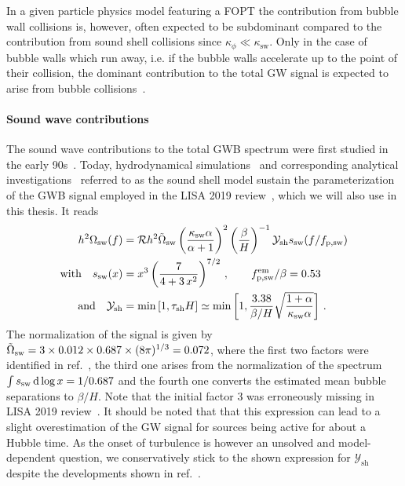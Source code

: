 In a given particle physics model featuring a \ac{FOPT} the contribution from bubble wall collisions is, however,  often expected to be subdominant compared to the contribution from sound shell collisions since $\kappa_\phi \ll \kappa_\text{sw}$. Only in the case of bubble walls which run away, i.e. if the bubble walls accelerate up to the point of their collision, the dominant contribution to the total \ac{GW} signal is expected to arise from bubble collisions~\cite{Vanvlasselaer:2022fqf}. 

\paragraph{Sound wave contributions}

The sound wave contributions to the total \ac{GWB} spectrum were first studied in the early 90s~\cite{Kamionkowski:1993fg}. Today, hydrodynamical simulations~\cite{Hindmarsh:2013xza, Hindmarsh:2015qta, Giblin:2014qia, Cutting:2019zws, Hindmarsh:2017gnf} and corresponding analytical investigations~\cite{Hindmarsh:2016lnk, Hindmarsh:2019phv} referred to as the sound shell model sustain the parameterization of the \ac{GWB} signal  employed in the LISA 2019 review~\cite{Caprini:2019egz, Hindmarsh:2017gnf}, which we will also use in this thesis. It reads
\begin{align}
	h^2 \Omega_\text{sw}(f) &= \mathcal{R}h^2 \tilde{\Omega}_{\text{sw}}  \left( \frac{\kappa_{\text{sw}}  \alpha}{\alpha + 1} \right)^2   \left( \frac{\beta}{H} \right)^{-1}  \mathcal{Y}_\text{sh}  s_{\text{sw}}(f/f_\text{p,\ensuremath{\text{sw}}}) \nonumber \\
	\text{with} \quad s_{\text{sw}}(x) &= x^3 \left( \frac{7}{4 + 3 \, x^2} \right)^{7/2} \, , \qquad f^\text{em}_\text{p,sw} / \beta = 0.53 \nonumber  \\
	\text{and} \quad \mathcal{Y}_\text{sh} &= \min \left[ 1, \tau_\text{sh} H \right] \simeq \min \left[ 1, \frac{3.38}{\beta/H} \sqrt{\frac{1 + \alpha}{\kappa_{\text{sw}} \alpha}} \right] \, . \label{eq:sw}
\end{align}
The normalization of the signal is given by $\tilde{\Omega}_{\text{sw}} = 3 \times 0.012 \times 0.687 \times (8\pi)^{1/3} = 0.072$, where the first two factors were identified in ref.~\cite{Hindmarsh:2017gnf}, the third one arises from the normalization of the spectrum $\int s_\text{sw} \mathop{}\!\mathrm{d} \log x  = 1/0.687$ and the fourth one converts the estimated mean bubble separations to $\beta/H$. Note that the initial factor 3 was erroneously missing in LISA 2019 review~\cite{Caprini:2019egz}. It should be noted that that this expression can lead to a slight overestimation of the \ac{GW} signal for sources being active for about a Hubble time. As the onset of turbulence is however an unsolved and model-dependent question, we conservatively stick to the shown expression for $\mathcal{Y}_\text{sh}$ despite the developments shown in ref.~\cite{Guo:2020grp}.

